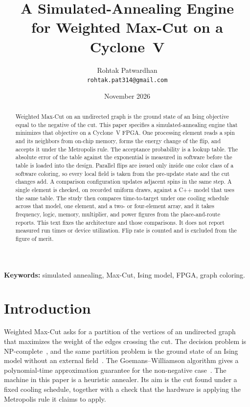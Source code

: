 \documentclass[10pt,twocolumn]{article}
\title{A Simulated-Annealing Engine\\for Weighted Max-Cut on a Cyclone~V}
\author{Rohtak Patwardhan\\
\small\texttt{rohtak.pat314@gmail.com}}
\date{November 2026}
\begin{document}
\maketitle

\begin{abstract}
Weighted Max-Cut on an undirected graph is the ground state of an Ising objective equal to the negative of the cut.
This paper specifies a simulated-annealing engine that minimizes that objective on a Cyclone~V FPGA.
One processing element reads a spin and its neighbors from on-chip memory, forms the energy change of the flip, and accepts it under the Metropolis rule.
The acceptance probability is a lookup table.
The absolute error of the table against the exponential is measured in software before the table is loaded into the design.
Parallel flips are issued only inside one color class of a software coloring, so every local field is taken from the pre-update state and the cut changes add.
A comparison configuration updates adjacent spins in the same step.
A single element is checked, on recorded uniform draws, against a C++ model that uses the same table.
The study then compares time-to-target under one cooling schedule across that model, one element, and a two- or four-element array, and it takes frequency, logic, memory, multiplier, and power figures from the place-and-route reports.
This text fixes the architecture and those comparisons.
It does not report measured run times or device utilization.
Flip rate is counted and is excluded from the figure of merit.
\end{abstract}

\noindent\textbf{Keywords:}
simulated annealing, Max-Cut, Ising model, FPGA, graph coloring.

\section{Introduction}

Weighted Max-Cut asks for a partition of the vertices of an undirected graph that maximizes the weight of the edges crossing the cut.
The decision problem is NP-complete~\citep{karp1972}, and the same partition problem is the ground state of an Ising model without an external field~\citep{barahona1982,lucas2014}.
The Goemans--Williamson algorithm gives a polynomial-time approximation guarantee for the non-negative case~\citep{goemans1995}.
The machine in this paper is a heuristic annealer.
Its aim is the cut found under a fixed cooling schedule, together with a check that the hardware is applying the Metropolis rule it claims to apply.
\end{document}
